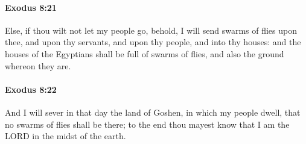 		\paragraph{Exodus 8:21} %
			\label{EXODUS-8-21}

			Else, if thou wilt not let my people go, behold, I will send swarms of flies upon thee, and upon thy servants, and upon thy people, and into thy houses: and the houses of the Egyptians shall be full of swarms of flies, and also the ground whereon they are.


		\paragraph{Exodus 8:22} %
			\label{EXODUS-8-22}

			And I will sever in that day the land of Goshen, in which my people dwell, that no swarms of flies shall be there; to the end thou mayest know that I am the LORD in the midst of the earth.

